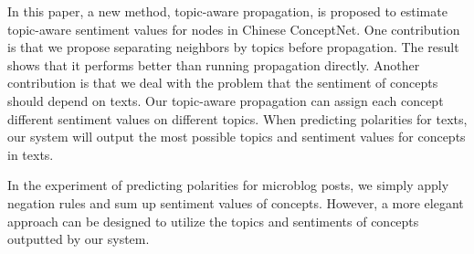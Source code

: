In this paper, a new method, topic-aware propagation, is proposed to estimate topic-aware sentiment values for nodes in Chinese ConceptNet. One contribution is that we propose separating neighbors by topics before propagation. The result shows that it performs better than running propagation directly. Another contribution is that we deal with the problem that the sentiment of concepts should depend on texts. Our topic-aware propagation can assign each concept different sentiment values on different topics. When predicting polarities for texts, our system will output the most possible topics and sentiment values for concepts in texts. 

In the experiment of predicting polarities for microblog posts, we simply apply negation rules and sum up sentiment values of concepts. However, a more elegant approach can be designed to utilize the topics and sentiments of concepts outputted by our system.